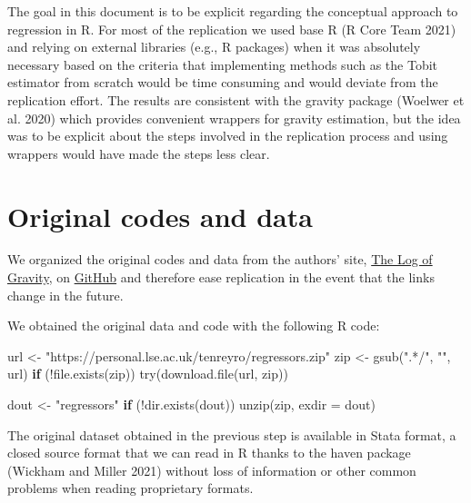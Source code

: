\documentclass[12pt]{article}
\newenvironment{Shaded}{\begin{snugshade}}{\end{snugshade}}
\newcommand{\AttributeTok}[1]{\textcolor[rgb]{0.40,0.45,0.13}{#1}}
\newcommand{\ControlFlowTok}[1]{\textcolor[rgb]{0.00,0.23,0.31}{\textbf{#1}}}
\newcommand{\FunctionTok}[1]{\textcolor[rgb]{0.28,0.35,0.67}{#1}}
\newcommand{\NormalTok}[1]{\textcolor[rgb]{0.00,0.23,0.31}{#1}}
\newcommand{\OtherTok}[1]{\textcolor[rgb]{0.00,0.23,0.31}{#1}}
\newcommand{\SpecialCharTok}[1]{\textcolor[rgb]{0.37,0.37,0.37}{#1}}
\newcommand{\StringTok}[1]{\textcolor[rgb]{0.13,0.47,0.30}{#1}}
\begin{document}
The goal in this document is to be explicit regarding the conceptual
approach to regression in R. For most of the replication we used base R
(R Core Team 2021) and relying on external libraries (e.g., R packages)
when it was absolutely necessary based on the criteria that implementing
methods such as the Tobit estimator from scratch would be time consuming
and would deviate from the replication effort. The results are
consistent with the gravity package (Woelwer et al. 2020) which provides
convenient wrappers for gravity estimation, but the idea was to be
explicit about the steps involved in the replication process and using
wrappers would have made the steps less clear.

\section{Original codes and data}\label{original-codes-and-data}

We organized the original codes and data from the authors' site,
\href{https://personal.lse.ac.uk/tenreyro/lgw.html}{The Log of Gravity},
on \href{https://github.com/pachadotdev/log-of-gravity}{GitHub} and
therefore ease replication in the event that the links change in the
future.

We obtained the original data and code with the following R code:

\begin{Shaded}
\begin{Highlighting}[]
\NormalTok{url }\OtherTok{\textless{}{-}} \StringTok{"https://personal.lse.ac.uk/tenreyro/regressors.zip"}
\NormalTok{zip }\OtherTok{\textless{}{-}} \FunctionTok{gsub}\NormalTok{(}\StringTok{".*/"}\NormalTok{, }\StringTok{""}\NormalTok{, url)}
\ControlFlowTok{if}\NormalTok{ (}\SpecialCharTok{!}\FunctionTok{file.exists}\NormalTok{(zip)) }\FunctionTok{try}\NormalTok{(}\FunctionTok{download.file}\NormalTok{(url, zip))}

\NormalTok{dout }\OtherTok{\textless{}{-}} \StringTok{"regressors"}
\ControlFlowTok{if}\NormalTok{ (}\SpecialCharTok{!}\FunctionTok{dir.exists}\NormalTok{(dout)) }\FunctionTok{unzip}\NormalTok{(zip, }\AttributeTok{exdir =}\NormalTok{ dout)}
\end{Highlighting}
\end{Shaded}

The original dataset obtained in the previous step is available in Stata
format, a closed source format that we can read in R thanks to the haven
package (Wickham and Miller 2021) without loss of information or other
common problems when reading proprietary formats.
\end{document}
